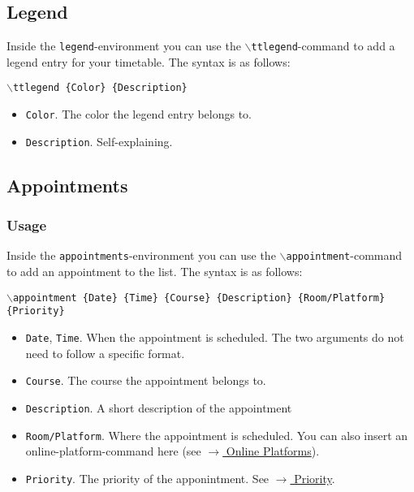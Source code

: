 \documentclass[english]{article}
\newcommand{\cmd}[1]{$\backslash$\texttt{{#1}}}
\begin{document}
	\subsection{Legend}
	\label{legend}	
	Inside the \texttt{legend}-environment you can use the \cmd{ttlegend}-command to add a legend entry for your timetable. The syntax is as follows:
	\begin{center}
		\cmd{ttlegend \{Color\} \{Description\}}
	\end{center}
	\begin{itemize}
		\item \texttt{Color}.
		The color the legend entry belongs to.
		
		\item \texttt{Description}.
		Self-explaining.			
	\end{itemize}
	
	
	\subsection{Appointments}
	\label{appointments}
	\subsubsection{Usage}
	Inside the \texttt{appointments}-environment you can use the \cmd{appointment}-command to add an appointment to the list. The syntax is as follows:
	\begin{center}
		\cmd{appointment \{Date\} \{Time\} \{Course\} \{Description\} \{Room/Platform\} \{Priority\}}
	\end{center}
	\begin{itemize}
		\item \texttt{Date}, \texttt{Time}.
		When the appointment is scheduled. The two arguments do not need to follow a specific format.
		
		\item \texttt{Course}.
		The course the appointment belongs to.
					
		\item \texttt{Description}.
		A short description of the appointment
		
		\item \texttt{Room/Platform}.
		Where the appointment is scheduled. You can also insert an online-platform-command here (see \hyperref[online]{$\rightarrow$ Online Platforms}). 
			
		\item \texttt{Priority}.
		The priority of the apponintment. See \hyperref[priority]{$\rightarrow$ Priority}.
	\end{itemize}
\end{document}
